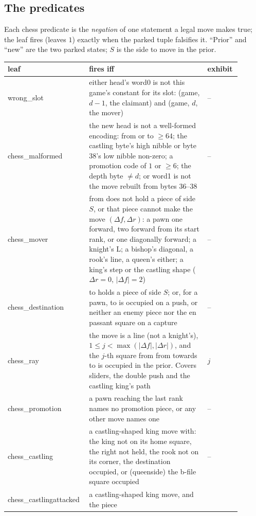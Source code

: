 \documentclass[11pt]{article}
\begin{document}
\subsection{The predicates}

Each chess predicate is the \emph{negation} of one statement a legal
move makes true; the leaf fires (leaves $1$) exactly when the parked
tuple falsifies it. ``Prior'' and ``new'' are the two parked states;
$S$ is the side to move in the prior.
\begin{center}
\small
\renewcommand{\arraystretch}{1.15}
\begin{tabular}{@{}>{\ttfamily}p{0.28\linewidth}p{0.49\linewidth}p{0.13\linewidth}@{}}
\toprule
\normalfont leaf & fires iff & exhibit \\
\midrule
wrong\_slot & either head's word0 is not this game's constant for its
  slot: (game, $d-1$, the claimant) and (game, $d$, the mover) & -- \\
chess\_malformed & the new head is not a well-formed encoding: from or
  to $\ge 64$; the castling byte's high nibble or byte 38's low nibble
  non-zero; a promotion code of $1$ or $\ge 6$; the depth byte $\ne d$;
  or word1 is not the move rebuilt from bytes 36--38 & -- \\
chess\_mover & from does not hold a piece of side $S$, or that piece
  cannot make the move $(\Delta f, \Delta r)$: a pawn one forward, two
  forward from its start rank, or one diagonally forward; a knight's
  L; a bishop's diagonal, a rook's line, a queen's either; a king's
  step or the castling shape ($\Delta r = 0$, $|\Delta f| = 2$) & -- \\
chess\_destination & to holds a piece of side $S$; or, for a pawn, to
  is occupied on a push, or neither an enemy piece nor the en passant
  square on a capture & -- \\
chess\_ray & the move is a line (not a knight's), $1 \le j <
  \max(|\Delta f|, |\Delta r|)$, and the $j$-th square from from
  towards to is occupied in the prior. Covers sliders, the double push
  and the castling king's path & $j$ \\
chess\_promotion & a pawn reaching the last rank names no promotion
  piece, or any other move names one & -- \\
chess\_castling & a castling-shaped king move with: the king not on
  its home square, the right not held, the rook not on its corner, the
  destination occupied, or (queenside) the b-file square occupied & -- \\
chess\_castlingattacked & a castling-shaped king move, and the piece

\end{tabular}
\end{center}
\end{document}
